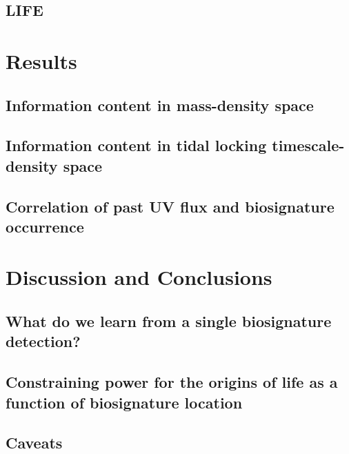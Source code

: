 \documentclass[modern,linenumbers]{aastex631}
\begin{document}
\subsection{LIFE} %


\section{Results}
\label{sec:results}
\subsection{Information content in mass-density space}

\subsection{Information content in tidal locking timescale-density space}

\subsection{Correlation of past UV flux and biosignature occurrence}

\section{Discussion and Conclusions}
\label{sec:discussion}

\subsection{What do we learn from a single biosignature detection?}

\subsection{Constraining power for the origins of life as a function of biosignature location}

\subsection{Caveats}
\end{document}
